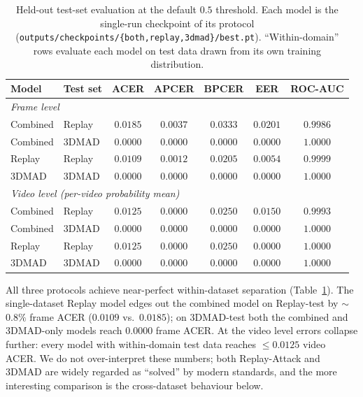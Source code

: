 \documentclass[anonymous, manuscript, screen, review]{acmart}
\begin{document}
\begin{table}[htbp]
\centering
\caption{Held-out test-set evaluation at the default $0{.}5$ threshold.
Each model is the single-run checkpoint of its protocol
(\texttt{outputs/checkpoints/\{both,replay,3dmad\}/best.pt}).
``Within-domain'' rows evaluate each model on test data drawn from
its own training distribution.}
\label{tab:within}
\small
\begin{tabular}{l l c c c c c}
\toprule
Model & Test set & ACER & APCER & BPCER & EER & ROC-AUC \\
\midrule
\multicolumn{7}{l}{\emph{Frame level}} \\
Combined & Replay & $0{.}0185$ & $0{.}0037$ & $0{.}0333$ & $0{.}0201$ & $0{.}9986$ \\
Combined & 3DMAD  & $0{.}0000$ & $0{.}0000$ & $0{.}0000$ & $0{.}0000$ & $1{.}0000$ \\
Replay   & Replay & $0{.}0109$ & $0{.}0012$ & $0{.}0205$ & $0{.}0054$ & $0{.}9999$ \\
3DMAD    & 3DMAD  & $0{.}0000$ & $0{.}0000$ & $0{.}0000$ & $0{.}0000$ & $1{.}0000$ \\
\midrule
\multicolumn{7}{l}{\emph{Video level (per-video probability mean)}} \\
Combined & Replay & $0{.}0125$ & $0{.}0000$ & $0{.}0250$ & $0{.}0150$ & $0{.}9993$ \\
Combined & 3DMAD  & $0{.}0000$ & $0{.}0000$ & $0{.}0000$ & $0{.}0000$ & $1{.}0000$ \\
Replay   & Replay & $0{.}0125$ & $0{.}0000$ & $0{.}0250$ & $0{.}0000$ & $1{.}0000$ \\
3DMAD    & 3DMAD  & $0{.}0000$ & $0{.}0000$ & $0{.}0000$ & $0{.}0000$ & $1{.}0000$ \\
\bottomrule
\end{tabular}
\end{table}

All three protocols achieve near-perfect within-dataset separation
(Table~\ref{tab:within}). The single-dataset Replay model edges out
the combined model on Replay-test by $\sim$$0{.}8\%$ frame ACER
($0{.}0109$ vs.\ $0{.}0185$); on 3DMAD-test both the combined and
3DMAD-only models reach $0{.}0000$ frame ACER. At the video level
errors collapse further: every model with within-domain test data
reaches $\le 0{.}0125$ video ACER. We do not over-interpret these
numbers; both Replay-Attack and 3DMAD are widely regarded as
``solved'' by modern standards, and the more interesting comparison
is the cross-dataset behaviour below.
\end{document}
